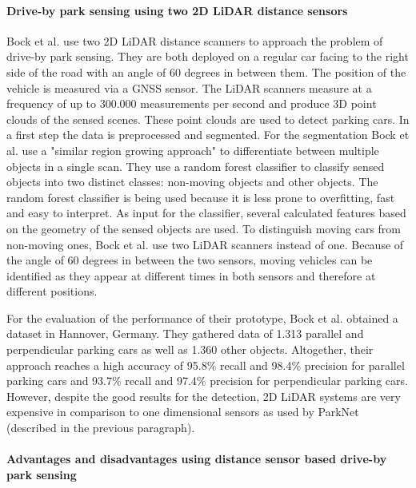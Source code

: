 \paragraph{Drive-by park sensing using two 2D LiDAR distance sensors}

Bock et al. \cite{Bock2015} use two 2D LiDAR distance scanners to approach the problem of drive-by park sensing. They are both deployed on a regular car facing to the right side of the road with an angle of 60 degrees in between them. The position of the vehicle is measured via a GNSS sensor.
The LiDAR scanners measure at a frequency of up to 300.000 measurements per second and produce 3D point clouds of the sensed scenes. These point clouds are used to detect parking cars. In a first step the data is preprocessed and segmented. For the segmentation Bock et al. use a "similar region growing approach" to differentiate between multiple objects in a single scan. They use a random forest classifier to classify sensed objects into two distinct classes: non-moving objects and other objects. The random forest classifier is being used because it is less prone to overfitting, fast and easy to interpret. As input for the classifier, several calculated features based on the geometry of the sensed objects are used. To distinguish moving cars from non-moving ones, Bock et al. use two LiDAR scanners instead of one. Because of the angle of 60 degrees in between the two sensors, moving vehicles can be identified as they appear at different times in both sensors and therefore at different positions.

For the evaluation of the performance of their prototype, Bock et al. obtained a dataset in Hannover, Germany. They gathered data of 1.313 parallel and perpendicular parking cars as well as 1.360 other objects. Altogether, their approach reaches a high accuracy of 95.8\% recall and 98.4\% precision for parallel parking cars and 93.7\% recall and 97.4\% precision for perpendicular parking cars. However, despite the good results for the detection, 2D LiDAR systems are very expensive in comparison to one dimensional sensors as used by ParkNet (described in the previous paragraph).


\paragraph{Advantages and disadvantages using distance sensor based drive-by park sensing}

